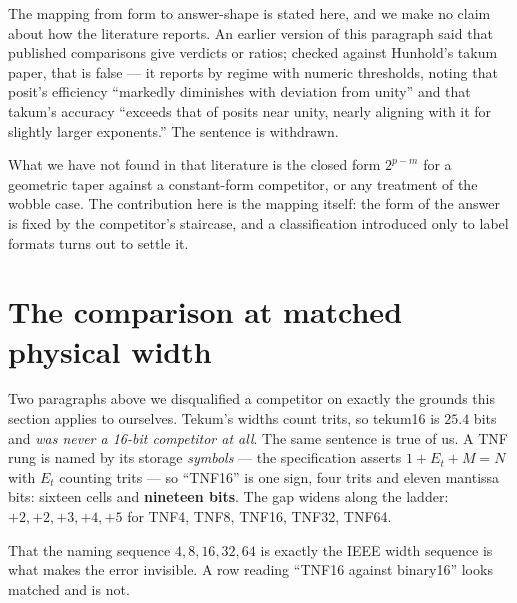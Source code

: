 The mapping from form to answer-shape is stated here, and we make no claim about
how the literature reports. An earlier version of this paragraph said that
published comparisons give verdicts or ratios; checked against Hunhold's takum
paper, that is false --- it reports by regime with numeric thresholds, noting
that posit's efficiency ``markedly diminishes with deviation from unity'' and
that takum's accuracy ``exceeds that of posits near unity, nearly aligning with
it for slightly larger exponents.'' The sentence is withdrawn.

What we have not found in that literature is the closed form $2^{p-m}$ for a
geometric taper against a constant-form competitor, or any treatment of the
wobble case. The contribution here is the mapping itself: the form of the answer
is fixed by the competitor's staircase, and a classification introduced only to
label formats turns out to settle it.
\section{The comparison at matched physical width}\label{sec:matchedwidth}

Two paragraphs above we disqualified a competitor on exactly the grounds this
section applies to ourselves. Tekum's widths count trits, so tekum16 is
$25.4$ bits and \emph{was never a 16-bit competitor at all}. The same sentence
is true of us. A TNF rung is named by its storage \emph{symbols} --- the
specification asserts $1 + E_t + M = N$ with $E_t$ counting trits --- so
``TNF16'' is one sign, four trits and eleven mantissa bits: sixteen cells and
\textbf{nineteen bits}. The gap widens along the ladder: $+2, +2, +3, +4, +5$
for TNF4, TNF8, TNF16, TNF32, TNF64.

That the naming sequence $4, 8, 16, 32, 64$ is exactly the IEEE width sequence
is what makes the error invisible. A row reading ``TNF16 against binary16''
looks matched and is not.

